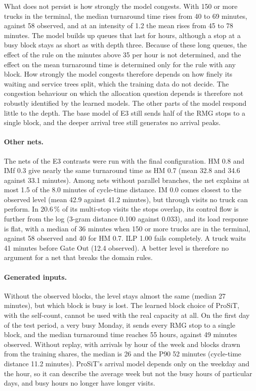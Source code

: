 What does not persist is how strongly the model congests. With 150 or more trucks in
the terminal, the median turnaround time rises from 40 to 69 minutes, against 58
observed, and at an intensity of 1.2 the mean rises from 45 to 78 minutes. The model
builds up queues that last for hours, although a stop at a busy block stays as short
as with depth three. Because of these long queues, the effect of the rule on the
minutes above 35 per hour is not determined, and the effect on the mean turnaround
time is determined only for the rule with any block. How strongly the model congests therefore depends on how finely its waiting and
service trees split, which the training data do not decide. The congestion behaviour
on which the allocation question depends is therefore not robustly identified by the
learned models. The other parts of the model respond little to the depth. The base model of E3 still sends half
of the RMG stops to a single block, and the deeper arrival tree still generates no
arrival peaks.

\paragraph{Other nets.} The nets of the E3 contrasts were run with the final
configuration. HM 0.8 and IMf 0.3 give nearly the same turnaround time as HM 0.7
(mean 32.8 and 34.6 against 33.1 minutes). Among nets without parallel branches, the
net explains at most 1.5 of the 8.0 minutes of cycle-time distance. IM 0.0 comes
closest to the observed level (mean 42.9 against 41.2 minutes), but through visits no
truck can perform. In 20.6\,\% of its multi-stop visits the stops overlap, its control
flow is further from the log (3-gram distance 0.100 against 0.033), and its load
response is flat, with a median of 36 minutes when 150 or more trucks are in the
terminal, against 58 observed and 40 for HM 0.7. ILP 1.00 fails completely. A truck
waits 41 minutes before Gate Out (12.4 observed). A better level is therefore no
argument for a net that breaks the domain rules.

\paragraph{Generated inputs.} Without the observed blocks, the level stays almost the
same (median 27 minutes), but which block is busy is lost. The learned block choice of
ProSiT, with the self-count, cannot be used with the real capacity at all. On the first
day of the test period, a very busy Monday, it sends every RMG stop to a single block,
and the median turnaround time reaches 55 hours, against 49 minutes observed. Without
replay, with arrivals by hour of the week and blocks drawn from the training shares,
the median is 26 and the P90 52 minutes (cycle-time distance 11.2 minutes).
ProSiT's arrival model depends only on the weekday and the hour, so it can describe
the average week but not the busy hours of particular days, and busy hours no longer
have longer visits.


